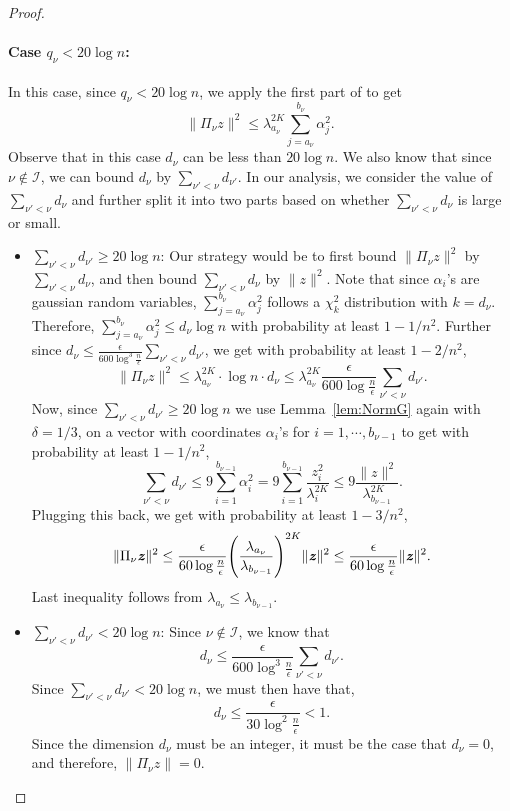 \documentclass[11pt]{article}
\let\originalleft\left
\let\originalright\right
\renewcommand{\left}{\mathopen{}\mathclose\bgroup\originalleft}
\renewcommand{\right}{\aftergroup\egroup\originalright}
\newcommand\zz{\boldsymbol{\mathit{z}}}
\begin{document}
\begin{proof}
\paragraph{Case $q_{\nu} <20 \log n$:} In this case, since $q_{\nu}<20\log n$, we apply the first part of  to get
\[
\|\Pi_{\nu}\zz\|^2\leq  \lambda_{a_{\nu}}^{2K} \sum_{j=a_{\nu}}^{b_{\nu}}\alpha_j^2.
\]
Observe that in this case $d_{\nu}$ can be less than $20\log n$. We also know that since $\nu \notin \mathcal{I}$, we can bound $d_{\nu}$ by $\sum_{\nu'<\nu}d_{\nu'}$. In our analysis, we consider the value of $\sum_{\nu'<\nu}d_{\nu}$ and further split it into two parts based on whether $\sum_{\nu'<\nu}d_{\nu}$ is large or small.
\begin{itemize}
    \item $\sum_{\nu'<\nu} d_{\nu'} \geq 20 \log n$: Our strategy would be to first bound $\|\Pi_{\nu}\zz\|^2$ by $\sum_{\nu'<\nu}d_{\nu}$, and then bound $\sum_{\nu'<\nu}d_{\nu}$ by $\|\zz\|^2$. Note that since $\alpha_i$'s are gaussian random variables, $\sum_{j=a_{\nu}}^{b_{\nu}}\alpha_j^2$ follows a $\chi^2_k$ distribution with $k = d_{\nu}$. Therefore, $\sum_{j=a_{\nu}}^{b_{\nu}}\alpha_j^2 \leq d_{\nu} \log n$ with probability at least $1-1/n^2$. Further since $d_{\nu}\leq \frac{\epsilon}{600 \log^3 \frac{n}{\epsilon}}\sum_{\nu'<\nu} d_{\nu'}$, we get with probability at least $1-2/n^2$,
    \[
    \|\Pi_{\nu}\zz\|^2\leq  \lambda_{a_{\nu}}^{2K} \cdot \log n\cdot d_{\nu} \leq \lambda_{a_{\nu}}^{2K}\frac{\epsilon}{600\log \frac{n}{\epsilon}}\sum_{\nu'<\nu} d_{\nu'}.
    \]
    Now, since $\sum_{\nu'<\nu} d_{\nu'} \geq 20 \log n$ we use Lemma~\ref{lem:NormG} again with $\delta = 1/3$, on a vector with coordinates $\alpha_i$'s for $i = 1,\cdots,b_{\nu-1}$ to get with probability at least $1-1/n^2$, 
    \[
    \sum_{\nu'<\nu} d_{\nu'} \leq 9\sum_{i=1}^{b_{\nu-1}}\alpha_i^2=9\sum_{i=1}^{b_{\nu-1}}\frac{z_i^2}{\lambda_i^{2K}} \leq 9\frac{\|\zz\|^2}{\lambda_{b_{\nu-1}}^{2K}}.
    \]
    Plugging this back, we get with probability at least $1-3/n^2$,
    \[
    \|\Pi_{\nu}\zz\|^2\leq \frac{\epsilon}{60\log \frac{n}{\epsilon}} \left(\frac{\lambda_{a_{\nu}}}{\lambda_{b_{\nu-1}}}\right)^{2K}\|\zz\|^2 \leq\frac{\epsilon}{60\log \frac{n}{\epsilon}}\|\zz\|^2.
\]
Last inequality follows from $\lambda_{a_{\nu}} \leq \lambda_{b_{\nu-1}}$.
\item $\sum_{\nu'<\nu} d_{\nu'} < 20 \log n$: Since $\nu\notin \mathcal{I}$, we know that 
\[
d_{\nu}\leq \frac{\epsilon}{600 \log^3\frac{n}{\epsilon}}\sum_{\nu'<\nu}d_{\nu'}.
\]
Since $\sum_{\nu'<\nu} d_{\nu'} < 20 \log n$, we must then have that,
\[
d_{\nu}\leq \frac{\epsilon}{30 \log^2\frac{n}{\epsilon}} <1.
\]
Since the dimension $d_{\nu}$ must be an integer, it must be the case that $d_{\nu} = 0$, and therefore, $\|\Pi_{\nu}\zz\| = 0.$
\end{itemize}
\end{proof}
\end{document}
